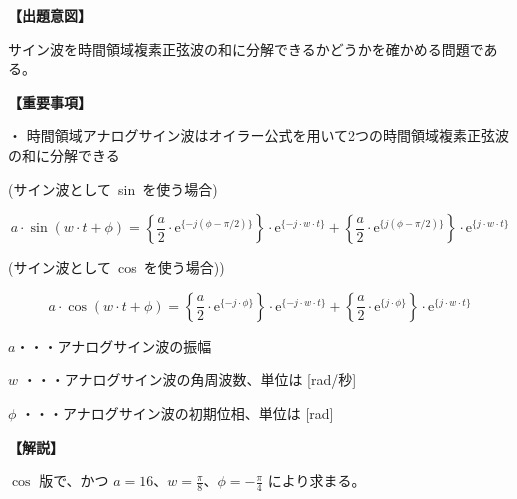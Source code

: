 \noindent \textbf{【出題意図】}

\bigskip
\noindent サイン波を時間領域複素正弦波の和に分解できるかどうかを確かめる問題である。

\vspace{1em}
\noindent \textbf{【重要事項】}

\medskip
\noindent ・ 時間領域アナログサイン波はオイラー公式を用いて2つの時間領域複素正弦波の和に分解できる

\medskip
\noindent \mbox{(サイン波として sin を使う場合)}

\[
a \cdot \sin ( w \cdot t + \phi )
=  \left \{ \frac{a}{2} \cdot \textrm{e}^{\{-j (\phi-\pi/2) \}} \right \} \cdot \textrm{e}^{\{-j \cdot w \cdot t \}}
+  \left \{ \frac{a}{2} \cdot \textrm{e}^{\{ j (\phi-\pi/2) \}} \right \} \cdot \textrm{e}^{\{ j \cdot w \cdot t \}}
\]

\medskip
\noindent \mbox{(サイン波として cos を使う場合))}

\[
a \cdot \cos ( w \cdot t + \phi )
=  \left \{ \frac{a}{2} \cdot \textrm{e}^{\{-j \cdot \phi \}} \right \} \cdot \textrm{e}^{\{-j \cdot w \cdot t \}}
+  \left \{ \frac{a}{2} \cdot \textrm{e}^{\{ j \cdot \phi \}} \right \} \cdot \textrm{e}^{\{ j \cdot w \cdot t \}}
\]

\bigskip
\noindent  $a$・・・アナログサイン波の振幅

\bigskip
\noindent $w$ ・・・アナログサイン波の角周波数、単位は [rad/秒]

\bigskip
\noindent $\phi$ ・・・アナログサイン波の初期位相、単位は [rad]

\bigskip

\vspace{1em}
\noindent \textbf{【解説】}

\bigskip

\bigskip
\noindent $\cos$ 版で、かつ $a = 16$、$w = \frac{\pi}{8}$、$\phi = -\frac{\pi}{4}$ により求まる。
